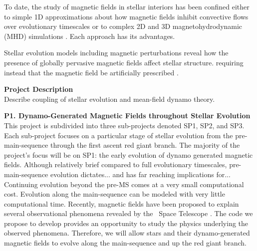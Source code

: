 \documentclass[12pt,a4paper]{article}
\begin{document}
To date, the study of magnetic fields in stellar interiors has been confined either to simple 1D approximations about how magnetic fields inhibit convective flows over evolutionary timescales \citep{GT66,LS95} or to complex 2D and 3D magnetohydrodynamic (MHD) simulations \citep[e.g.,][]{Brandenburg2005, Stein2012}. Each approach has its advantages. 

Stellar evolution models including magnetic perturbations \citep[e.g.,][]{FC12b} reveal how the presence of globally pervasive magnetic fields affect stellar structure. requiring instead that the magnetic field be artificially prescribed \citep[e.g.,][]{MM01,FC12b,FC13}. 



%

{\bf \large Project Description} \\
Describe coupling of stellar evolution and mean-field dynamo theory. 


\textbf{P1. Dynamo-Generated Magnetic Fields throughout Stellar Evolution} \\
This project is subdivided into three sub-projects denoted SP1, SP2, and SP3. Each sub-project focuses on a particular stage of stellar evolution from the pre-main-sequence through the first ascent red giant branch. The majority of the project's focus will be on SP1: the early evolution of dynamo generated magnetic fields. Although relatively brief compared to full evolutionary timescales, pre-main-sequence evolution dictates... and has far reaching implications for... Continuing evolution beyond the pre-MS comes at a very small computational cost. Evolution along the main-sequence can be modeled with very little computational time. Recently, magnetic fields have been proposed to explain several observational phenomena revealed by the \kepler\ Space Telescope \citep{Fuller2015, vanSaders2016}. The code we propose to develop provides an opportunity to study the physics underlying the observed phenomena. Therefore, we will allow stars and their dynamo-generated magnetic fields to evolve along the main-sequence and up the red giant branch. 
\end{document}
